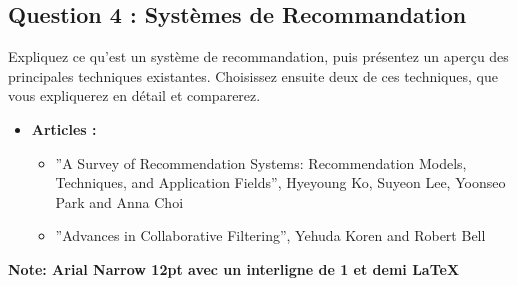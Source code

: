 \subsection{Question 4 : Systèmes de Recommandation}
\label{annexe:question4}
Expliquez ce qu’est un système de recommandation, puis présentez un aperçu des principales techniques existantes. Choisissez ensuite deux de ces techniques, que vous expliquerez en détail et comparerez.
\begin{itemize}
    \item \textbf{Articles :}
    \begin{itemize}
        \item ”A Survey of Recommendation Systems: Recommendation Models, Techniques, and Application Fields”, Hyeyoung Ko, Suyeon Lee, Yoonseo Park and Anna Choi
        \item ”Advances in Collaborative Filtering”, Yehuda Koren and Robert Bell
    \end{itemize}
\end{itemize}

\textbf{Note: Arial Narrow 12pt avec un interligne de 1 et demi \LaTeX}


